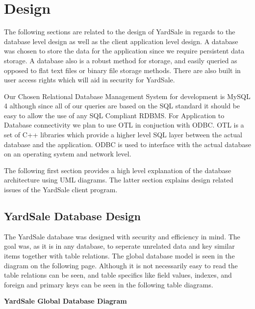 \documentclass{report}
\begin{document}
\chapter{Design}

    The following sections are related to the design of YardSale
    in regards to the database level design as well as the client
    application level design. A database was chosen to store the
    data for the application since we require persistent data
    storage. A database also is a robust method for storage, and
    easily queried as opposed to flat text files or binary file
    storage methods. There are also built in user access rights
    which will aid in security for YardSale.

    Our Chosen Relational Database Management System for development is
    MySQL 4 although since all of our queries are based on the
    SQL standard it should be easy to allow the use of any
    SQL Compliant RDBMS. For Application to Database connectivity
    we plan to use OTL in conjuction with ODBC. OTL is a set of C++
    libraries which provide a higher level SQL layer between the
    actual database and the application. ODBC is used to interface
    with the actual database on an operating system and network
    level.

    The following first section provides a high level
    explanation of the database architecture using UML diagrams. The
    latter section explains design related issues of the YardSale
    client program.

\section{YardSale Database Design}

    The YardSale database was designed with security and efficiency in
    mind. The goal was, as it is in any database, to seperate unrelated
    data and key similar items together with table relations. The global
    database model is seen in the diagram on the following page. Although
    it is not necessarily easy to read the table relations can be seen, and
    table specifics like field values, indexes, and foreign and primary keys
    can be seen in the following table diagrams.

    \newpage

    {\bf YardSale Global Database Diagram}\\
    \\
    \\
\end{document}
